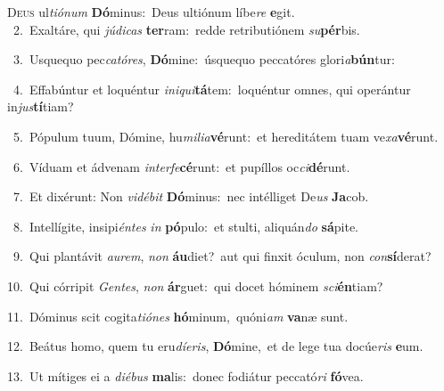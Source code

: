 \lettrine{\initial\textcolor{\initialcolor}{D}}{eus} ul\-\textit{ti}\-\textit{ó}\textit{num} \textbf{Dó}\-minus:~\star Deus ultiónum líbe\textit{re} \textbf{e}\-git.\\
{\numbfont\textcolor{\numbcolor}{~2.}}~Exaltáre, qui \textit{jú}\-\textit{di}\textit{cas} \textbf{ter}\-ram:~\star redde retributiónem \textit{su}\-\textbf{pér}bis.\par
{\numbfont\textcolor{\numbcolor}{~3.}}~Usquequo pec\-\textit{ca}\-\textit{tó}\textit{res}, \textbf{Dó}\-mine:~\star úsquequo peccatóres glori\-\textit{a}\-\textbf{bún}tur:\par
{\numbfont\textcolor{\numbcolor}{~4.}}~Effabúntur et loquéntur \textit{in}\-\textit{i}\textit{qui}\textbf{tá}tem:~\star loquéntur omnes, qui operántur in\-\textit{jus}\-\textbf{tí}tiam?\par
{\numbfont\textcolor{\numbcolor}{~5.}}~Pópulum tuum, Dómine, hu\-\textit{mi}\-\textit{li}\textit{a}\textbf{vé}runt:~\star et hereditátem tuam ve\-\textit{xa}\-\textbf{vé}runt.\par
{\numbfont\textcolor{\numbcolor}{~6.}}~Víduam et ádvenam \textit{in}\-\textit{ter}\textit{fe}\textbf{cé}runt:~\star et pupíllos oc\-\textit{ci}\-\textbf{dé}runt.\par
{\numbfont\textcolor{\numbcolor}{~7.}}~Et dixérunt: Non \textit{vi}\-\textit{dé}\textit{bit} \textbf{Dó}\-minus:~\star nec intélliget De\textit{us} \textbf{Ja}\-cob.\par
{\numbfont\textcolor{\numbcolor}{~8.}}~Intellígite, insipi\-\textit{én}\-\textit{tes} \textit{in} \textbf{pó}\-pulo:~\star et stulti, aliquán\textit{do} \textbf{sá}\-pite.\par
{\numbfont\textcolor{\numbcolor}{~9.}}~Qui plantávit \textit{au}\-\textit{rem}, \textit{non} \textbf{áu}\-diet?~\star aut qui finxit óculum, non \textit{con}\-\textbf{sí}derat?\par
{\numbfont\textcolor{\numbcolor}{10.}}~Qui córripit \textit{Gen}\-\textit{tes}, \textit{non} \textbf{ár}\-guet:~\star qui docet hóminem \textit{sci}\-\textbf{én}tiam?\par
{\numbfont\textcolor{\numbcolor}{11.}}~Dóminus scit cogita\-\textit{ti}\-\textit{ó}\textit{nes} \textbf{hó}\-minum,~\star quóni\textit{am} \textbf{va}\-næ sunt.\par
{\numbfont\textcolor{\numbcolor}{12.}}~Beátus homo, quem tu eru\-\textit{dí}\-\textit{e}\textit{ris}, \textbf{Dó}\-mine,~\star et de lege tua docúe\textit{ris} \textbf{e}\-um.\par
{\numbfont\textcolor{\numbcolor}{13.}}~Ut mítiges ei a \textit{di}\-\textit{é}\textit{bus} \textbf{ma}\-lis:~\star donec fodiátur peccató\textit{ri} \textbf{fó}\-vea.\par
